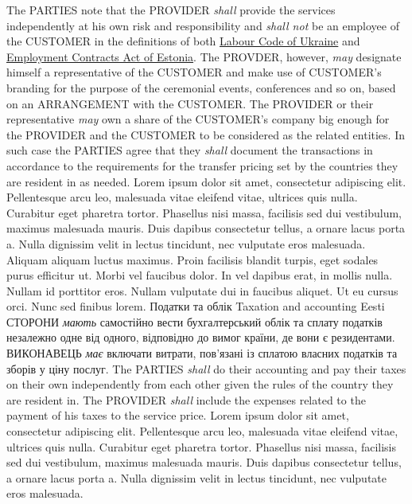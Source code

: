 \begin{Form}
\begin{paracol}{3}
        {The PARTIES note that the PROVIDER \textit{shall} provide the services independently at his own risk and responsibility and \textit{shall not} be an employee of the CUSTOMER in the definitions of both \href{http://zakon2.rada.gov.ua/laws/show/322-08}{Labour Code of Ukraine} and \href{https://www.riigiteataja.ee/en/eli/530102013061/consolide}{Employment Contracts Act of Estonia}. The PROVDER, however, \textit{may} designate himself a representative of the CUSTOMER and make use of CUSTOMER's branding for the purpose of the ceremonial events, conferences and so on, based on an ARRANGEMENT with the CUSTOMER. The PROVIDER or their representative \textit{may} own a share of the CUSTOMER's company big enough for the PROVIDER and the CUSTOMER to be considered as the related entities. In such case the PARTIES agree that they \textit{shall} document the transactions in accordance to the requirements for the transfer pricing set by the countries they are resident in as needed.}
        {Lorem ipsum dolor sit amet, consectetur adipiscing elit. Pellentesque arcu leo, malesuada vitae eleifend vitae, ultrices quis nulla. Curabitur eget pharetra tortor. Phasellus nisi massa, facilisis sed dui vestibulum, maximus malesuada mauris. Duis dapibus consectetur tellus, a ornare lacus porta a. Nulla dignissim velit in lectus tincidunt, nec vulputate eros malesuada. Aliquam aliquam luctus maximus. Proin facilisis blandit turpis, eget sodales purus efficitur ut. Morbi vel faucibus dolor. In vel dapibus erat, in mollis nulla. Nullam id porttitor eros. Nullam vulputate dui in faucibus aliquet. Ut eu cursus orci. Nunc sed finibus lorem.}
      \clause
        {Податки та облік}
        {Taxation and accounting}
        {Eesti}
        {СТОРОНИ \textit{мають} самостійно вести бухгалтерський облік та сплату податків незалежно одне від одного, відповідно до вимог країни, де вони є резидентами. ВИКОНАВЕЦЬ \textit{має} включати витрати, пов’язані із сплатою власних податків та зборів у ціну послуг.
        }
        {The PARTIES \textit{shall} do their accounting and pay their taxes on their own independently from each other given the rules of the country they are resident in. The PROVIDER \textit{shall} include the expenses related to the payment of his taxes to the service price.}
        {Lorem ipsum dolor sit amet, consectetur adipiscing elit. Pellentesque arcu leo, malesuada vitae eleifend vitae, ultrices quis nulla. Curabitur eget pharetra tortor. Phasellus nisi massa, facilisis sed dui vestibulum, maximus malesuada mauris. Duis dapibus consectetur tellus, a ornare lacus porta a. Nulla dignissim velit in lectus tincidunt, nec vulputate eros malesuada. }

\end{paracol}
\end{Form}
